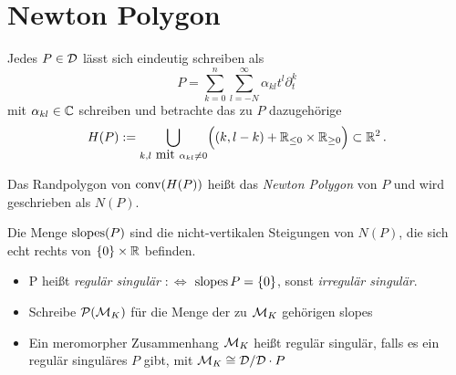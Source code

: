 \section{Newton Polygon} %
Jedes $P\in \mathcal{D}$ lässt sich eindeutig schreiben als
\[ P=\sum^{n}_{k=0}{\sum^{\infty}_{l=-N}{\alpha_{kl}t^l\partial_t^k}} \]
mit $\alpha_{kl}\in\mathbb{C}$ schreiben und betrachte das zu $P$ dazugehörige
\[ H(P):=\underset{k,l\mbox{ mit }\alpha_{kl}\neq0}{\bigcup}\Big( (k,l-k) +
\mathbb{R}_{\leq 0}\times \mathbb{R}_{\geq 0} \Big) \subset \mathbb{R}^2 \,. \]
\begin{comment}
  Bei Sabbah: $H\subset \N\times\Z$ und dann konvexe Hülle davon in $\R^2$
\end{comment}

\begin{defn} %
  Das Randpolygon von $\operatorname{conv}(H(P))$ heißt das \emph{Newton Polygon} von $P$ und
  wird geschrieben als $N(P)$.
\end{defn}

\begin{defn} %
  Die Menge $\operatorname{slopes}(P)$ sind die nicht-vertikalen Steigungen von $N(P)$, die
  sich echt rechts von $\{0\}\times\mathbb{R}$ befinden.\\ %
  \begin{itemize}
    \item P heißt \emph{regulär singulär} $:\Leftrightarrow$
      $\operatorname{slopes}{P}=\{0\}$, sonst \emph{irregulär singulär}.
    \item Schreibe $\mathcal{P}(\mathcal{M}_K)$ für die Menge der zu $\mathcal{M}_K$ gehörigen slopes
    \item Ein meromorpher Zusammenhang $\mathcal{M}_K$ heißt regulär singulär, falls es
      ein regulär singuläres $P$ gibt, mit $\mathcal{M}_K\cong\mathcal{D}/\mathcal{D}\cdot P$
  \end{itemize}
\end{defn}

